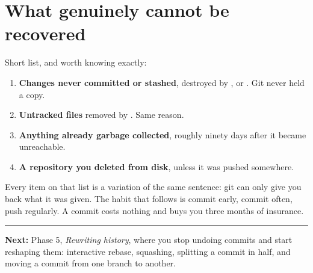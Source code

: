 \documentclass[11pt]{article}
\begin{document}
\section{What genuinely cannot be recovered}

Short list, and worth knowing exactly:

\begin{enumerate}
  \item \textbf{Changes never committed or stashed}, destroyed by
    ,  or . Git never held a
    copy.
  \item \textbf{Untracked files} removed by . Same reason.
  \item \textbf{Anything already garbage collected}, roughly ninety days after it
    became unreachable.
  \item \textbf{A repository you deleted from disk}, unless it was pushed somewhere.
\end{enumerate}

Every item on that list is a variation of the same sentence: git can only give you
back what it was given. The habit that follows is commit early, commit often, push
regularly. A commit costs nothing and buys you three months of insurance.


\vspace{1em}
{\color{rhborder}\rule{\linewidth}{0.8pt}}

\textbf{Next:} Phase 5, \emph{Rewriting history}, where you stop undoing commits and
start reshaping them: interactive rebase, squashing, splitting a commit in half, and
moving a commit from one branch to another.
\end{document}

